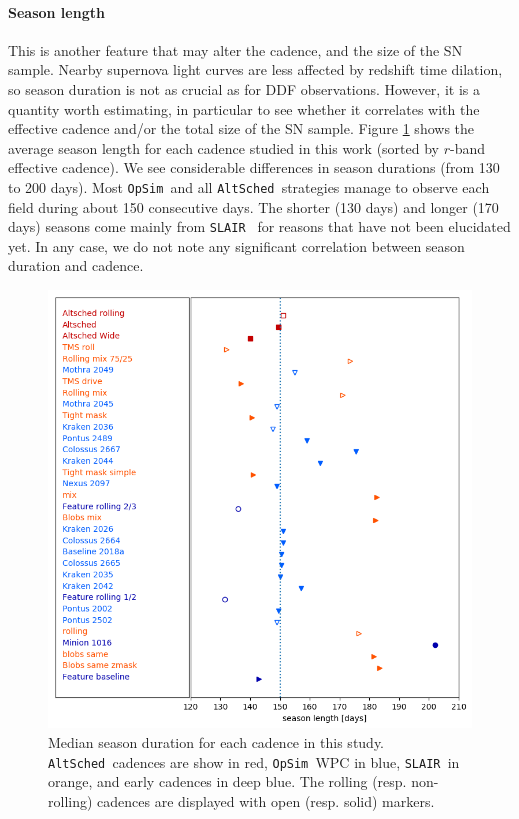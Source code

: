 \documentclass [11pt,a4paper]{article}
\newcommand{\opsim}{{\tt OpSim\ }}
\newcommand{\slair}{{\tt SLAIR\ }}
\newcommand{\altsched}{{\tt AltSched\ }}
\begin{document}
\paragraph{Season length} This is another feature that may alter the cadence, and the size of the SN sample.
Nearby supernova light curves are less
affected by redshift time dilation, so season duration is not as
crucial as for DDF observations.  However, it is a quantity worth
estimating, in particular to see whether it correlates with the
effective cadence and/or the total size of the SN sample.
Figure \ref{fig:season_length} shows the average season length for
each cadence studied in this work (sorted by $r$-band effective
cadence).  We see considerable differences in season durations (from 130 to 200 days).
Most \opsim and all \altsched strategies manage to observe each field during about
150 consecutive days. The shorter (130 days) and longer (170 days) seasons come mainly from  \slair 
for reasons that have not been elucidated yet. In any case, we do not
note any significant correlation between season duration and cadence.

\begin{figure}
  \begin{center}
    \includegraphics[width=0.8\linewidth]{Figures/season_length.png}
    \caption{Median season duration for each cadence in this
      study. \altsched cadences are show in red, \opsim WPC in blue,
      \slair in orange, and early cadences in deep blue. The rolling
      (resp. non-rolling) cadences are displayed with open
      (resp. solid) markers. }
    \label{fig:season_length}
  \end{center}
\end{figure}
\end{document}
